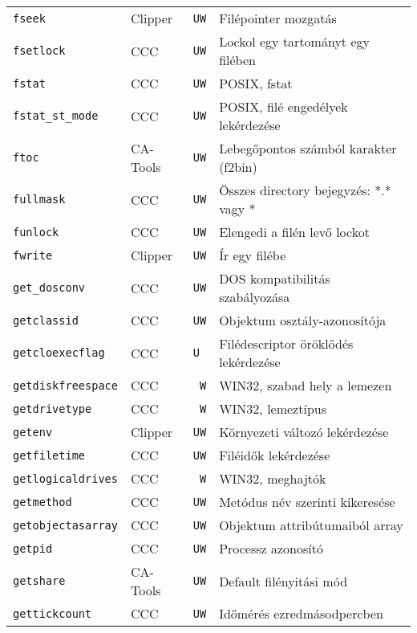 \begin{tabular}{|l|l|l|l|}
\verb!fseek!                       & Clipper  &  {\tt UW} & Filépointer mozgatás\\
\verb!fsetlock!                    & CCC      &  {\tt UW} & Lockol egy tartományt egy filében\\
\verb!fstat!                       & CCC      &  {\tt UW} & POSIX, fstat\\
\verb!fstat_st_mode!               & CCC      &  {\tt UW} & POSIX, filé engedélyek lekérdezése\\
\verb!ftoc!                        & CA-Tools &  {\tt UW} & Lebegőpontos számból karakter (f2bin)\\   
\verb!fullmask!                    & CCC      &  {\tt UW} & Összes directory bejegyzés: *.* vagy *\\
\verb!funlock!                     & CCC      &  {\tt UW} & Elengedi a filén levő lockot\\
\verb!fwrite!                      & Clipper  &  {\tt UW} & Ír egy filébe\\
\verb!get_dosconv!                 & CCC      &  {\tt UW} & DOS kompatibilitás szabályozása\\  
\verb!getclassid!                  & CCC      &  {\tt UW} & Objektum osztály-azonosítója\\
\verb!getcloexecflag!              & CCC      &  {\tt U~} & Filédescriptor öröklődés lekérdezése\\
\verb!getdiskfreespace!            & CCC      &  {\tt ~W} & WIN32, szabad hely a lemezen\\
\verb!getdrivetype!                & CCC      &  {\tt ~W} & WIN32, lemeztípus\\
\verb!getenv!                      & Clipper  &  {\tt UW} & Környezeti változó lekérdezése\\   
\verb!getfiletime!                 & CCC      &  {\tt UW} & Filéidők lekérdezése\\
\verb!getlogicaldrives!            & CCC      &  {\tt ~W} & WIN32, meghajtók\\
\verb!getmethod!                   & CCC      &  {\tt UW} & Metódus név szerinti kikeresése\\
\verb!getobjectasarray!            & CCC      &  {\tt UW} & Objektum attribútumaiból array\\
\verb!getpid!                      & CCC      &  {\tt UW} & Processz azonosító\\
\verb!getshare!                    & CA-Tools &  {\tt UW} & Default filényitási mód\\
\verb!gettickcount!                & CCC      &  {\tt UW} & Időmérés ezredmásodpercben\\

\end{tabular}
